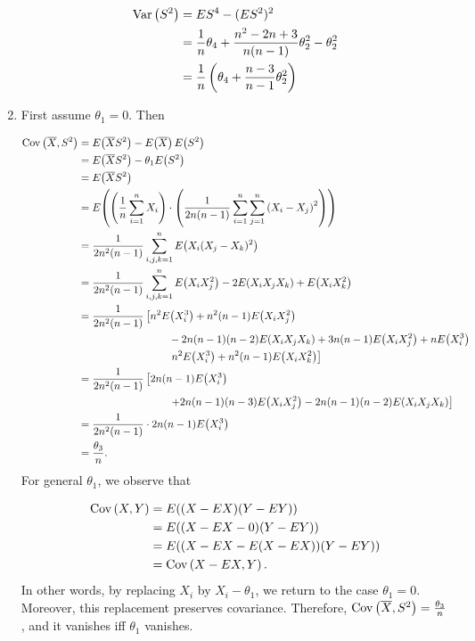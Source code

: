 \documentclass[12pt,letterpaper,reqno]{amsart}
\numberwithin{equation}{subsection}
\begin{document}
\begin{enumerate}[label=(\alph*),leftmargin=*]
    \begin{align*}
        \operatorname{Var}\left( {S^2} \right) &= ES^4 - (ES^2)^2 \\
        &= \frac{1}{n} \theta_4 + \frac{n^2-2n+3}{n(n-1)} \theta_2^2 - \theta_2^2 \\
        &= \frac{1}{n} \left(\theta_4 + \frac{n-3}{n-1} \theta_2^2 \right)
    \end{align*}
    
    \item First assume $\theta_1 = 0$. Then
    
    \begin{align*}
        \Cov{\ol{X}, S^2} &= \fun{E}{\ol{X} S^2} - \fun{E}{\ol{X}} \fun{E}{S^2} \\
        &= \fun{E}{\ol{X} S^2} - \theta_1 \fun{E}{S^2} \\
        &= \fun{E}{\ol{X} S^2} \\
        &= \fun{E}{\left( \frac{1}{n} \sum_{i=1}^n X_i \right) \cdot \left(\frac{1}{2n(n-1)} \sum_{i=1}^n \sum_{j=1}^n \left( X_i - X_j \right)^2 \right)} \\
        &= \frac{1}{2n^2(n-1)} \sum_{i,j,k=1}^n \fun{E}{X_i(X_j-X_k)^2} \\
        &= \frac{1}{2n^2(n-1)} \sum_{i,j,k=1}^n \fun{E}{X_i X_j^2} - 2 \fun{E}{X_i X_j X_k} + \fun{E}{X_i X_k^2} \\
        &= \frac{1}{2n^2(n-1)} \left[ n^2 \fun{E}{X_i^3} + n^2(n-1)\fun{E}{X_i X_j^2} \right. \\
        & \hspace{3cm} -2n(n-1)(n-2)\fun{E}{X_i X_j X_k} + 3n(n-1) \fun{E}{X_i X_j^2} + n \fun{E}{X_i^3} \\
        & \hspace{3cm} \left. n^2 \fun{E}{X_i^3} + n^2(n-1) \fun{E}{X_i X_k^2} \right] \\
        &= \frac{1}{2n^2(n-1)} \left[ 2n(n-1) \fun{E}{X_i^3} \right. \\
        & \hspace{3cm} \left. + 2n(n-1)(n-3) \fun{E}{X_i X_j^2} - 2n(n-1)(n-2) \fun{E}{X_i X_j X_k} \right] \\
        &= \frac{1}{2n^2(n-1)} \cdot 2n(n-1) \fun{E}{X_i^3} \\
        &= \frac{\theta_3}{n}.
    \end{align*}
    For general $\theta_1$, we observe that
    
    \begin{align*}
        \operatorname{Cov}\left( {X, Y} \right) &= {E}\! \left( {(X-EX)(Y-EY)} \right) \\
                   &= {E}\! \left( {(X-EX-0)(Y-EY)} \right) \\
                   &= {E}\! \left( {(X-EX-E(X-EX))(Y-EY)} \right) \\
                   &= \operatorname{Cov}\left( {X-EX, Y} \right).
    \end{align*}
    In other words, by replacing $X_i$ by $X_i - \theta_1$, we return to the case $\theta_1 = 0$. Moreover, this replacement preserves covariance. Therefore, $\operatorname{Cov}\left( {\overline{{X}}, S^2} \right) = \frac{\theta_3}{n}$, and it vanishes iff $\theta_1$ vanishes.
\end{enumerate}
\end{document}
